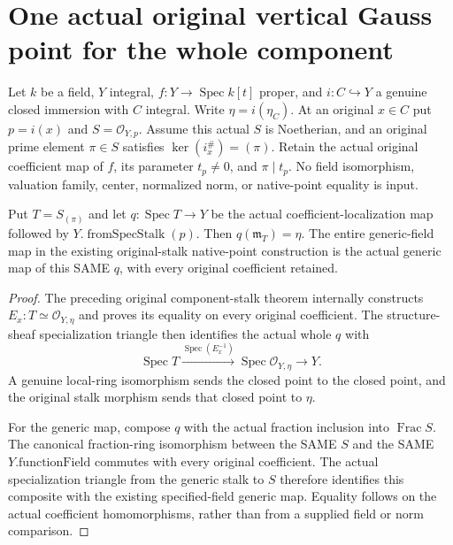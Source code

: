 \section{One actual original vertical Gauss point for the whole component}

Let $k$ be a field, $Y$ integral, $f:Y\to\operatorname{Spec}k[t]$ proper,
and $i:C\hookrightarrow Y$ a genuine closed immersion with $C$ integral.
Write $\eta=i(\eta_C)$. At an original $x\in C$ put
$p=i(x)$ and $S=\mathcal O_{Y,p}$. Assume this actual $S$ is Noetherian,
and an original prime element $\pi\in S$ satisfies
$\ker(i_x^\#)=(\pi)$. Retain the actual original coefficient map of $f$,
its parameter $t_p\ne0$, and $\pi\mid t_p$. No field isomorphism,
valuation family, center, normalized norm, or native-point equality is input.

\begin{lemma}
\label{lem:gauss-common-original-vertical-dvr-morphism}
\leanok
Put $T=S_{(\pi)}$ and let $q:\operatorname{Spec}T\to Y$ be the actual
coefficient-localization map followed by $Y.\operatorname{fromSpecStalk}(p)$.
Then $q(\mathfrak m_T)=\eta$. The entire generic-field map in the existing
original-stalk native-point construction is the actual generic map of this
SAME $q$, with every original coefficient retained.
\end{lemma}
\begin{proof}
The preceding original component-stalk theorem internally constructs
$E_x:T\simeq\mathcal O_{Y,\eta}$ and proves its equality on every
original coefficient. The structure-sheaf specialization triangle then
identifies the actual whole $q$ with
\[
 \operatorname{Spec}T\xrightarrow{\operatorname{Spec}(E_x^{-1})}
 \operatorname{Spec}\mathcal O_{Y,\eta}\longrightarrow Y.
\]
A genuine local-ring isomorphism sends the closed point to the closed
point, and the original stalk morphism sends that closed point to $\eta$.

For the generic map, compose $q$ with the actual fraction inclusion into
$\operatorname{Frac}S$. The canonical fraction-ring isomorphism between
the SAME $S$ and the SAME $Y.\mathrm{functionField}$ commutes with every
original coefficient. The actual specialization triangle from the generic
stalk to $S$ therefore identifies this composite with the existing
specified-field generic map. Equality follows on the actual coefficient
homomorphisms, rather than from a supplied field or norm comparison.
\end{proof}


